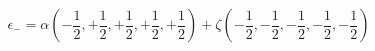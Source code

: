 \begin{equation}
\label{mmspinors}
\epsilon_{-}=\alpha  (- \frac{1}{2}, + \frac{1%
}{2}, + \frac{1}{2},+ \frac{1}{2}, + \frac{1}{2}) + \zeta  (- \frac{1}{2}, - \frac{1%
}{2}, - \frac{1}{2},- \frac{1}{2}, - \frac{1}{2})
\end{equation}

